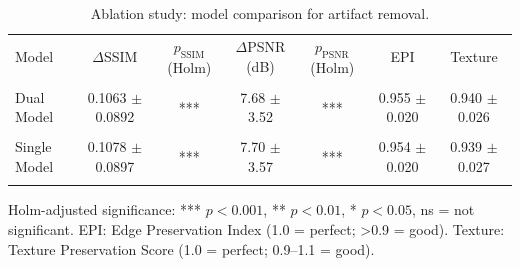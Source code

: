 \begin{table}[htbp]
\centering
\caption{Ablation study: model comparison for artifact removal.}
\label{tab:ablation_comparison}
\begin{tabular}{lcccccc}
\toprule
Model & $\Delta$SSIM & $p_{\mathrm{SSIM}}$ (Holm) & $\Delta$PSNR (dB) & $p_{\mathrm{PSNR}}$ (Holm) & EPI & Texture \\\\ 
\midrule
Dual Model & 0.1063 $\pm$ 0.0892 & *** & 7.68 $\pm$ 3.52 & *** & 0.955 $\pm$ 0.020 & 0.940 $\pm$ 0.026 \\\\
Single Model & 0.1078 $\pm$ 0.0897 & *** & 7.70 $\pm$ 3.57 & *** & 0.954 $\pm$ 0.020 & 0.939 $\pm$ 0.027 \\\\
\bottomrule
\end{tabular}
\par\smallskip\footnotesize Holm-adjusted significance: *** $p<0.001$, ** $p<0.01$, * $p<0.05$, ns = not significant. EPI: Edge Preservation Index (1.0 = perfect; >0.9 = good). Texture: Texture Preservation Score (1.0 = perfect; 0.9--1.1 = good).
\end{table}
